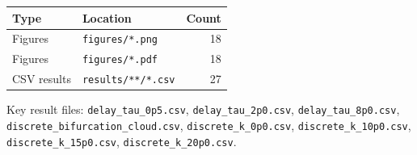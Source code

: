 \begin{tabular}{llr}
\toprule
Type & Location & Count \\
\midrule
Figures & \texttt{figures/*.png} & 18 \\
Figures & \texttt{figures/*.pdf} & 18 \\
CSV results & \texttt{results/**/*.csv} & 27 \\
\bottomrule
\end{tabular}

\vspace{0.5em}

\noindent Key result files: \texttt{delay\_tau\_0p5.csv}, \texttt{delay\_tau\_2p0.csv}, \texttt{delay\_tau\_8p0.csv}, \texttt{discrete\_bifurcation\_cloud.csv}, \texttt{discrete\_k\_0p0.csv}, \texttt{discrete\_k\_10p0.csv}, \texttt{discrete\_k\_15p0.csv}, \texttt{discrete\_k\_20p0.csv}.

